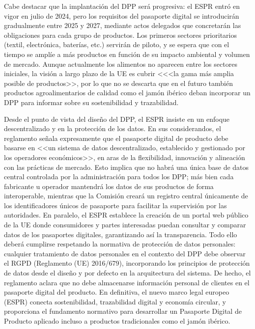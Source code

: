Cabe destacar que la implantación del DPP será progresiva: el ESPR entró en vigor en julio de 2024, pero los requisitos del pasaporte digital se introducirán gradualmente entre 2025 y 2027, mediante actos delegados que concretarán las obligaciones para cada grupo de productos. Los primeros sectores prioritarios (textil, electrónica, baterías, etc.) servirán de piloto, y se espera que con el tiempo se amplíe a más productos en función de su impacto ambiental y volumen de mercado. Aunque actualmente los alimentos no aparecen entre los sectores iniciales, la visión a largo plazo de la UE es cubrir <<<la gama más amplia posible de productos>>, por lo que no se descarta que en el futuro también productos agroalimentarios de calidad como el jamón ibérico deban incorporar un DPP para informar sobre su sostenibilidad y trazabilidad. \cite{ESPREnergyLabelling}

Desde el punto de vista del diseño del DPP, el ESPR insiste en un enfoque descentralizado y en la protección de los datos. En sus considerandos, el reglamento señala expresamente que el pasaporte digital de producto debe basarse en <<un sistema de datos descentralizado, establecido y gestionado por los operadores económicos>>, en aras de la flexibilidad, innovación y alineación con las prácticas de mercado. Esto implica que no habrá una única base de datos central controlada por la administración para todos los DPP; más bien cada fabricante u operador mantendrá los datos de sus productos de forma interoperable, mientras que la Comisión creará un registro central únicamente de los identificadores únicos de pasaporte para facilitar la supervisión por las autoridades. En paralelo, el ESPR establece la creación de un portal web público de la UE donde consumidores y partes interesadas puedan consultar y comparar datos de los pasaportes digitales, garantizando así la transparencia. Todo ello deberá cumplirse respetando la normativa de protección de datos personales: cualquier tratamiento de datos personales en el contexto del DPP debe observar el RGPD (Reglamento (UE) 2016/679), incorporando los principios de protección de datos desde el diseño y por defecto en la arquitectura del sistema. De hecho, el reglamento aclara que no debe almacenarse información personal de clientes en el pasaporte digital del producto. En definitiva, el nuevo marco legal europeo (ESPR) conecta sostenibilidad, trazabilidad digital y economía circular, y proporciona el fundamento normativo para desarrollar un Pasaporte Digital de Producto aplicado incluso a productos tradicionales como el jamón ibérico.


